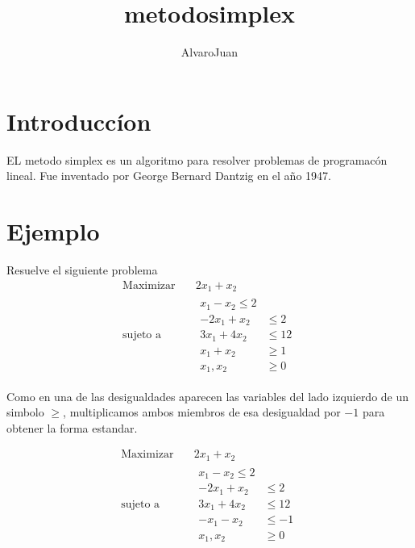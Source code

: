 \documentclass{article}
\title{metodosimplex}
\author{AlvaroJuan}
\begin{document}
\maketitle

\section{Introduccíon}
\label{sec:itroduccion}

EL metodo simplex es un algoritmo para resolver problemas de
programacón lineal.
Fue inventado por George Bernard Dantzig en el año 1947.

\section{Ejemplo}
\label{sec:ejemplo}

Resuelve el siguiente problema 
\begin{equation*}
 \begin{aligned}
\text{Maximizar} \quad & 2x_{1}+x_{2}\\
\text{sujeto a} \quad &
  \begin{aligned}
    x_{1}-x_{2}
    \leq 2\\
   -2x_{1}+x_{2} &\leq 2\\
   3x_{1}+4x_{2} &\leq 12\\
   x_{1}+x_{2} &\geq 1\\
    x_{1},x_{2} &\geq 0
  \end{aligned}
\end{aligned}
\end{equation*}

Como en una de las desigualdades aparecen las variables del lado
izquierdo de un simbolo $\geq$, multiplicamos ambos miembros de esa
desigualdad por $-1$ para obtener la forma estandar.

\begin{equation*}
 \begin{aligned}
\text{Maximizar} \quad & 2x_{1}+x_{2}\\
\text{sujeto a} \quad &
  \begin{aligned}
   x_{1}-x_{2}\leq 2\\
  -2x_{1}+x_{2} &\leq 2\\
   3x_{1}+4x_{2} &\leq 12\\
  -x_{1}-x_{2} &\leq -1\\
  x_{1},x_{2} &\geq 0
  \end{aligned}
\end{aligned}
\end{equation*}
\end{document}
